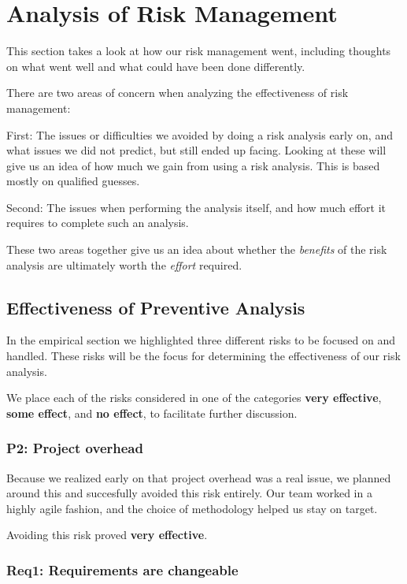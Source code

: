 \section{Analysis of Risk Management}
This section takes a look at how our risk management went, including thoughts on what went well and what could have been done differently.
\label{sec:AnalysisRiskManagement}

There are two areas of concern when analyzing the effectiveness of risk
management:

First: The issues or difficulties we avoided by doing a risk analysis early on,
and what issues we did not predict, but still ended up facing. Looking
at these will give us an idea of how much we gain from using a risk analysis.
This is based mostly on qualified guesses.

Second: The issues when performing the analysis itself, and how much effort
it requires to complete such an analysis.

These two areas together give us an idea about whether the \emph{benefits} of the risk analysis are
ultimately worth the \emph{effort} required.

\subsection{Effectiveness of Preventive Analysis}

In the empirical section we highlighted three different risks to be focused on and handled. These risks
will be the focus for determining the effectiveness of our risk analysis.

We place each of the risks considered in one of the categories \textbf{very effective}, \textbf{some
effect}, and \textbf{no effect}, to facilitate further discussion.

\subsubsection{P2: Project overhead}

Because we realized early on that project overhead was a real issue, we planned around this and succesfully
avoided this risk entirely. Our team worked in a highly agile fashion, and the choice of methodology helped
us stay on target.

Avoiding this risk proved \textbf{very effective}.

\subsubsection{Req1: Requirements are changeable}

